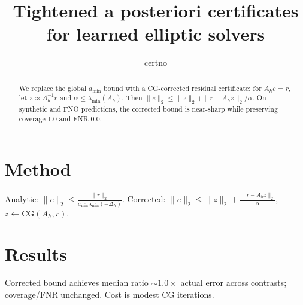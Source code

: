 \documentclass[10pt]{article}
\title{Tightened a posteriori certificates for learned elliptic solvers}
\author{certno}
\begin{document}
\maketitle

\begin{abstract}
We replace the global $a_{\min}$ bound with a CG-corrected residual certificate: for $A_h e=r$, let $z\approx A_h^{-1}r$ and $\alpha\le \lambda_{\min}(A_h)$. Then $\|e\|_2 \le \|z\|_2 + \|r-A_h z\|_2/\alpha$. On synthetic and FNO predictions, the corrected bound is near-sharp while preserving coverage 1.0 and FNR 0.0.
\end{abstract}

\section{Method}
Analytic: $\|e\|_2 \le \frac{\|r\|_2}{a_{\min}\lambda_{\min}(-\Delta_h)}$. Corrected: $\|e\|_2 \le \|z\|_2 + \frac{\|r-A_h z\|_2}{\alpha}$, $z\leftarrow \text{CG}(A_h,r)$.

\section{Results}
Corrected bound achieves median ratio $\sim 1.0\times$ actual error across contrasts; coverage/FNR unchanged. Cost is modest CG iterations.
\end{document}

